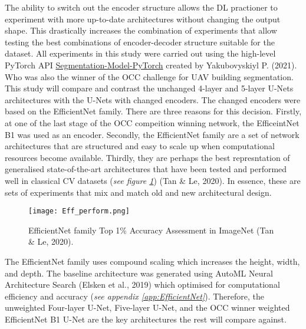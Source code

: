 \documentclass[11pt, a4paper, twoside]{report}
\begin{document}
The ability to switch out the encoder structure allows the DL practioner to experiment with more up-to-date architectures without changing the output shape. This drastically increases the combination of experiments that allow testing the best combinations of encoder-decoder structure suitable for the dataset. All experiments in this study were carried out using the high-level PyTorch API \href{https://segmentation-models-pytorch.readthedocs.io/en/latest/quickstart.html}{Segmentation-Model-PyTorch} created by Yakubovyskiyl P. (2021). Who was also the winner of the OCC challenge for UAV building segmentation. This study will compare and contrast the unchanged 4-layer and 5-layer U-Nets architectures with the U-Nets with changed encoders. The changed encoders were based on the EfficientNet family. There are three reasons for this decision. Firstly, at one of the last stage of the OCC compeition winning network, the EfficeintNet B1 was used as an encoder. Secondly, the EfficientNet family are a set of network architectures that are structured and easy to scale up when computational resources become available. Thirdly, they are perhaps the best represntation of generalised state-of-the-art architectures that have been tested and performed well in classical CV datasets (\textit{see figure \ref{fig:Eff_perform}}) (Tan \& Le, 2020). In essence, these are sets of experiments that mix and match old and new architectural design.\\\par

\begin{figure}[H]
  \centering
  \texttt{[image: Eff\_perform.png]}
  \caption{EfficientNet family Top 1\% Accuracy Assessment in ImageNet (Tan \& Le, 2020).}
  \label{fig:Eff_perform}
\end{figure}

The EfficientNet family uses compound scaling which increases the height, width, and depth. The baseline architecture was generated using AutoML Neural Architecture Search (Elsken et al., 2019) which optimised for computational efficiency and accuracy (\textit{see appendix \ref{app:EfficientNet}}). Therefore, the unweighted Four-layer U-Net, Five-layer U-Net, and the OCC winner weighted EfficientNet B1 U-Net are the key architectures the rest will compare against.\\\par
\end{document}
